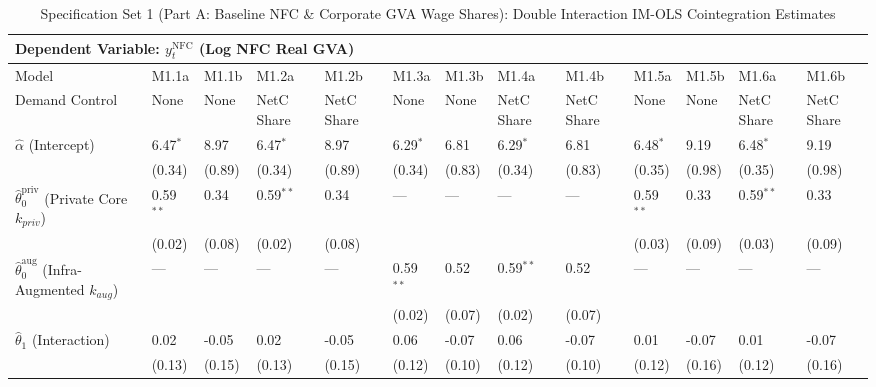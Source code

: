 \begin{table}[H]
\centering
\caption{Specification Set 1 (Part A: Baseline NFC \& Corporate GVA Wage Shares): Double Interaction IM-OLS Cointegration Estimates}
\label{tab:spec_set_1_a}
\scriptsize
\begin{tabular}{p{3.8cm}p{1.5cm}p{1.5cm}p{1.5cm}p{1.5cm}p{1.5cm}p{1.5cm}p{1.5cm}p{1.5cm}p{1.5cm}p{1.5cm}p{1.5cm}p{1.5cm}}
\toprule
\multicolumn{13}{l}{\textbf{Dependent Variable: $y_t^{\text{NFC}}$ (Log NFC Real GVA)}} \\
\midrule
Model & M1.1a & M1.1b & M1.2a & M1.2b & M1.3a & M1.3b & M1.4a & M1.4b & M1.5a & M1.5b & M1.6a & M1.6b  \\
Demand Control & None & None & NetC Share & NetC Share & None & None & NetC Share & NetC Share & None & None & NetC Share & NetC Share  \\
\midrule
$\hat{\alpha}$ (Intercept)  & 6.47$^{*}$ & 8.97 & 6.47$^{*}$ & 8.97 & 6.29$^{*}$ & 6.81 & 6.29$^{*}$ & 6.81 & 6.48$^{*}$ & 9.19 & 6.48$^{*}$ & 9.19  \\
 & {\scriptsize (0.34)} & {\scriptsize (0.89)} & {\scriptsize (0.34)} & {\scriptsize (0.89)} & {\scriptsize (0.34)} & {\scriptsize (0.83)} & {\scriptsize (0.34)} & {\scriptsize (0.83)} & {\scriptsize (0.35)} & {\scriptsize (0.98)} & {\scriptsize (0.35)} & {\scriptsize (0.98)}  \\
$\hat{\theta}_0^{\text{priv}}$ (Private Core $k_{priv}$)  & 0.59$^{**}$ & 0.34 & 0.59$^{**}$ & 0.34 & --- & --- & --- & --- & 0.59$^{**}$ & 0.33 & 0.59$^{**}$ & 0.33  \\
 & {\scriptsize (0.02)} & {\scriptsize (0.08)} & {\scriptsize (0.02)} & {\scriptsize (0.08)} &  &  &  &  & {\scriptsize (0.03)} & {\scriptsize (0.09)} & {\scriptsize (0.03)} & {\scriptsize (0.09)}  \\
$\hat{\theta}_0^{\text{aug}}$ (Infra-Augmented $k_{aug}$)  & --- & --- & --- & --- & 0.59$^{**}$ & 0.52 & 0.59$^{**}$ & 0.52 & --- & --- & --- & ---  \\
 &  &  &  &  & {\scriptsize (0.02)} & {\scriptsize (0.07)} & {\scriptsize (0.02)} & {\scriptsize (0.07)} &  &  &  &   \\
$\hat{\theta}_1$ (Interaction)  & 0.02 & -0.05 & 0.02 & -0.05 & 0.06 & -0.07 & 0.06 & -0.07 & 0.01 & -0.07 & 0.01 & -0.07  \\
 & {\scriptsize (0.13)} & {\scriptsize (0.15)} & {\scriptsize (0.13)} & {\scriptsize (0.15)} & {\scriptsize (0.12)} & {\scriptsize (0.10)} & {\scriptsize (0.12)} & {\scriptsize (0.10)} & {\scriptsize (0.12)} & {\scriptsize (0.16)} & {\scriptsize (0.12)} & {\scriptsize (0.16)}  \\

\end{tabular}
\end{table}
